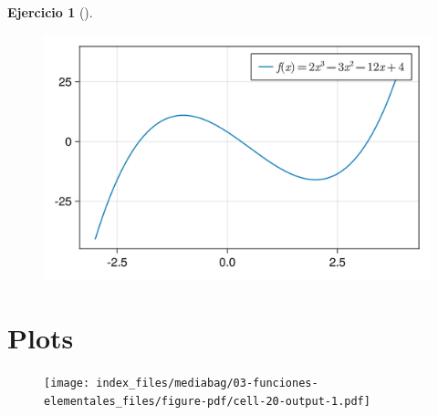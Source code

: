 \documentclass[
  a4paper,
]{scrreport}
\newenvironment{Shaded}{\begin{snugshade}}{\end{snugshade}}
\newcommand{\BuiltInTok}[1]{\textcolor[rgb]{0.00,0.23,0.31}{#1}}
\newcommand{\FloatTok}[1]{\textcolor[rgb]{0.68,0.00,0.00}{#1}}
\newcommand{\FunctionTok}[1]{\textcolor[rgb]{0.28,0.35,0.67}{#1}}
\newcommand{\ImportTok}[1]{\textcolor[rgb]{0.00,0.46,0.62}{#1}}
\newcommand{\NormalTok}[1]{\textcolor[rgb]{0.00,0.23,0.31}{#1}}
\newcommand{\OperatorTok}[1]{\textcolor[rgb]{0.37,0.37,0.37}{#1}}
\newcommand{\SpecialCharTok}[1]{\textcolor[rgb]{0.37,0.37,0.37}{#1}}
\newcommand{\StringTok}[1]{\textcolor[rgb]{0.13,0.47,0.30}{#1}}
\theoremstyle{definition}
\newtheorem{exercise}{Ejercicio}[chapter]
\theoremstyle{remark}
\begin{document}
\begin{exercise}[]
\begin{tcolorbox}
\begin{figure}[H]

{\centering \includegraphics{03-funciones-elementales_files/figure-pdf/cell-19-output-1.png}

}

\end{figure}

\section{Plots}

\begin{Shaded}
\end{Shaded}

\begin{figure}[H]

{\centering \texttt{[image: index\_files/mediabag/03-funciones-elementales\_files/figure-pdf/cell-20-output-1.pdf]}

}

\end{figure}


\end{tcolorbox}
\end{exercise}
\end{document}
